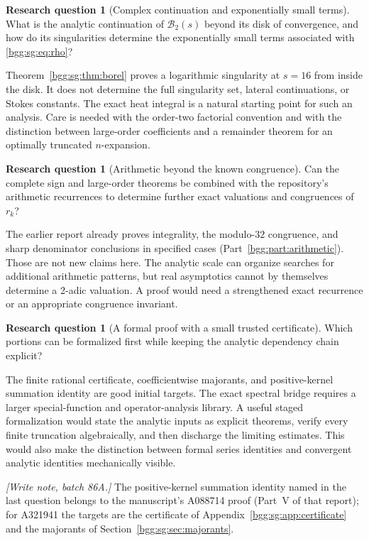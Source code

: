 \documentclass[11pt,a4paper]{article}
\numberwithin{equation}{section}
\theoremstyle{definition}
\theoremstyle{remark}
\theoremstyle{definition}
\newtheorem{question}[theorem]{Research question}
\begin{document}
\begin{question}[Complex continuation and exponentially small terms]
\label{bgg:sg:q:continuation}
What is the analytic continuation of \(\mathscr B_2(s)\) beyond
its disk of convergence, and how do its singularities determine
the exponentially small terms associated with \eqref{bgg:sg:eq:rho}?
\end{question}
Theorem~\ref{bgg:sg:thm:borel} proves a logarithmic singularity at
\(s=16\) from inside the disk.  It does not determine the full
singularity set, lateral continuations, or Stokes constants.
The exact heat integral is a natural starting point for such an
analysis.  Care is needed with the order-two factorial convention
and with the distinction between large-order coefficients and a
remainder theorem for an optimally truncated \(n\)-expansion.

\begin{question}[Arithmetic beyond the known congruence]
\label{bgg:sg:q:arithmetic}
Can the complete sign and large-order theorems be combined with
the repository's arithmetic recurrences to determine further
exact valuations and congruences of \(r_k\)?
\end{question}
The earlier report already proves integrality, the modulo-\(32\)
congruence, and sharp denominator conclusions in specified cases
(Part~\ref{bgg:part:arithmetic}).  Those are not new claims here.
The analytic scale can organize searches for additional arithmetic
patterns, but real asymptotics cannot by themselves determine a
2-adic valuation.  A proof would need a strengthened exact
recurrence or an appropriate congruence invariant.

\begin{question}[A formal proof with a small trusted certificate]
\label{bgg:sg:q:formal}
Which portions can be formalized first while keeping the
analytic dependency chain explicit?
\end{question}
The finite rational certificate, coefficientwise majorants, and
positive-kernel summation identity are good initial targets.
The exact spectral bridge requires a larger special-function and
operator-analysis library.  A useful staged formalization would
state the analytic inputs as explicit theorems, verify every
finite truncation algebraically, and then discharge the limiting
estimates.  This would also make the distinction between formal
series identities and convergent analytic identities mechanically
visible.

\emph{[Write note, batch 86A.]} The positive-kernel summation identity
named in the last question belongs to the manuscript's A088714 proof
(Part~V of that report); for A321941 the targets are the certificate of
Appendix~\ref{bgg:sg:app:certificate} and the majorants of
Section~\ref{bgg:sg:sec:majorants}.
\end{document}
